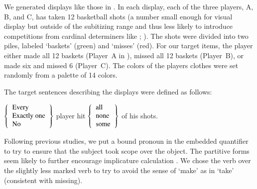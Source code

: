 \documentclass[leqno,12pt]{article}
\begin{document}
We generated displays like those in . In
each display, each of the three players, A, B, and C, has taken 12
basketball shots (a number small enough for visual display but outside
of the subitizing range and thus less likely to introduce competitions
from cardinal determiners like ;
\citealt{Degen:Tanenhaus:2014}). The shots were divided into two
piles, labeled `baskets' (green) and `misses' (red).  For our target
items, the player either made all 12 baskets (Player~A in
), missed all 12 baskets (Player~B), or
made six and missed 6 (Player~C). The colors of the players clothes
were set randomly from a palette of 14 colors.

The target sentences describing the displays were defined as follows:
%
\begin{examples}
\item\label{expmsgs} 
  $\set{
      \begin{tabular}[c]{l}
        Every \\
        Exactly one \\
        No 
      \end{tabular}}$
    player hit 
    $\set{
      \begin{tabular}[c]{l}
        all \\
        none \\
        some 
      \end{tabular}}$
    of his shots.  
\end{examples}
%
Following previous studies, we put a bound pronoun in the embedded
quantifier to try to ensure that the subject took scope over the
object. The partitive forms seem likely to further encourage
implicature calculation
\citep{reed:1991-interpreting,Grodner-etal:2010,degen:inpress-SP}. We
chose the verb  over the slightly less marked verb
 to try to avoid the sense of `make' as in `take'
(consistent with missing).
\end{document}
